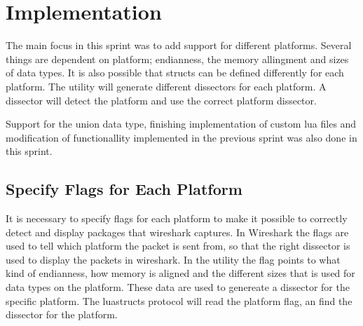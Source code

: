 \begin{table}[htbp] \footnotesize \center
\caption{User stories - Sprint 3 part 4\label{tab:req:stories10}}
\noindent{}
\end{table}


\section{Implementation}
\label{sec:sp3:impl}
The main focus in this sprint was to add support for different platforms. Several 
things are dependent on platform; \gls{endianness}, the memory allingment and sizes 
of data types. It is also possible that \glspl{struct} can be defined differently for 
each platform. The \gls{utility} will generate different \glspl{dissector} for each 
platform. A \gls{dissector} will detect the platform and use the correct 
platform \gls{dissector}.

Support for the \gls{union} data type, finishing implementation of custom \Gls{lua} files 
and modification of functionallity implemented in the previous sprint was also 
done in this sprint.

\subsection{Specify Flags for Each Platform}
It is necessary to specify flags for each platform to make it possible to 
correctly detect and display packages that wireshark captures. In Wireshark
the flags are used to tell which platform the \gls{packet} is sent from, so that 
the right \gls{dissector} is used to display the \glspl{packet} in \Gls{wireshark}. In the 
\gls{utility} the flag points to what kind of \gls{endianness}, how memory is aligned and 
the different sizes that is used for data types on the platform. These data 
are used to genereate a \gls{dissector} for the specific platform. The 
luastructs protocol will read the platform flag, an find the dissector for the 
platform.

